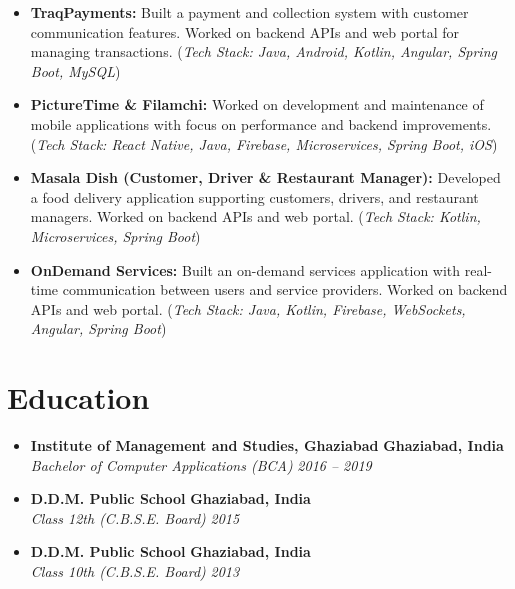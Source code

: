 \documentclass[10pt, a4paper]{article}
\begin{document}
\begin{itemize}[leftmargin=1.5em, itemsep=0.75ex, topsep=0.5ex, label=\textbullet]
\item \textbf{TraqPayments:} Built a payment and collection system with customer communication features. Worked on backend APIs and web portal for managing transactions. (\textit{Tech Stack: Java, Android, Kotlin, Angular, Spring Boot, MySQL})

\item \textbf{PictureTime \& Filamchi:} Worked on development and maintenance of mobile applications with focus on performance and backend improvements. (\textit{Tech Stack: React Native, Java, Firebase, Microservices, Spring Boot, iOS})

\item \textbf{Masala Dish (Customer, Driver \& Restaurant Manager):} Developed a food delivery application supporting customers, drivers, and restaurant managers. Worked on backend APIs and web portal. (\textit{Tech Stack: Kotlin, Microservices, Spring Boot})

\item \textbf{OnDemand Services:} Built an on-demand services application with real-time communication between users and service providers. Worked on backend APIs and web portal. (\textit{Tech Stack: Java, Kotlin, Firebase, WebSockets, Angular, Spring Boot})

\end{itemize}

\section*{Education}
\begin{itemize}[leftmargin=0pt, itemsep=1ex, topsep=0.5ex, partopsep=0pt]
    \item
    \textbf{Institute of Management and Studies, Ghaziabad} \hfill \textbf{Ghaziabad, India} \\
    \textit{Bachelor of Computer Applications (BCA)} \hfill \textit{2016 – 2019}
    
    \item
    \textbf{D.D.M. Public School} \hfill \textbf{Ghaziabad, India} \\
    \textit{Class 12th (C.B.S.E. Board)} \hfill \textit{2015}
    
    \item
    \textbf{D.D.M. Public School} \hfill \textbf{Ghaziabad, India} \\
    \textit{Class 10th (C.B.S.E. Board)} \hfill \textit{2013}
\end{itemize}
\end{document}
